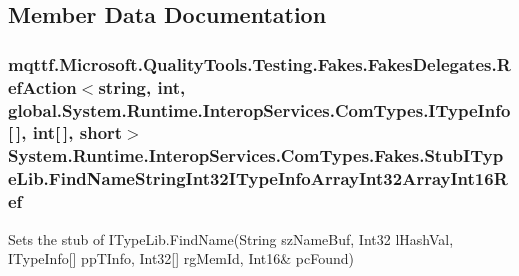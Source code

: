 \subsection{Member Data Documentation}
\hypertarget{class_system_1_1_runtime_1_1_interop_services_1_1_com_types_1_1_fakes_1_1_stub_i_type_lib_aa4a66b372ce36caabce6353485048065}{
\subsubsection[{Find\-Name\-String\-Int32\-I\-Type\-Info\-Array\-Int32\-Array\-Int16\-Ref}]{\setlength{\rightskip}{0pt plus 5cm}mqttf.\-Microsoft.\-Quality\-Tools.\-Testing.\-Fakes.\-Fakes\-Delegates.\-Ref\-Action$<$string, int, global.\-System.\-Runtime.\-Interop\-Services.\-Com\-Types.\-I\-Type\-Info\mbox{[}$\,$\mbox{]}, int\mbox{[}$\,$\mbox{]}, short$>$ System.\-Runtime.\-Interop\-Services.\-Com\-Types.\-Fakes.\-Stub\-I\-Type\-Lib.\-Find\-Name\-String\-Int32\-I\-Type\-Info\-Array\-Int32\-Array\-Int16\-Ref}}\label{class_system_1_1_runtime_1_1_interop_services_1_1_com_types_1_1_fakes_1_1_stub_i_type_lib_aa4a66b372ce36caabce6353485048065}


Sets the stub of I\-Type\-Lib.\-Find\-Name(String sz\-Name\-Buf, Int32 l\-Hash\-Val, I\-Type\-Info\mbox{[}\mbox{]} pp\-T\-Info, Int32\mbox{[}\mbox{]} rg\-Mem\-Id, Int16\& pc\-Found)

